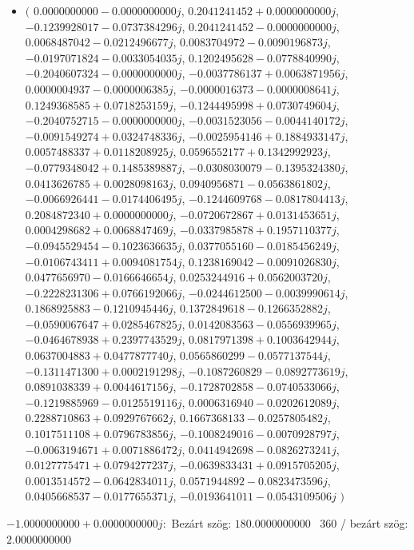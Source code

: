 \documentclass[14pt,a4paper]{article}
\begin{document}
\begin{itemize}
\item
$\big($
$0.0000000000-0.0000000000j$, $0.2041241452+0.0000000000j$, $-0.1239928017-0.0737384296j$, $0.2041241452-0.0000000000j$, $0.0068487042-0.0212496677j$, $0.0083704972-0.0090196873j$, $-0.0197071824-0.0033054035j$, $0.1202495628-0.0778840990j$, $-0.2040607324-0.0000000000j$, $-0.0037786137+0.0063871956j$, $0.0000004937-0.0000006385j$, $-0.0000016373-0.0000008641j$, $0.1249368585+0.0718253159j$, $-0.1244495998+0.0730749604j$, $-0.2040752715-0.0000000000j$, $-0.0031523056-0.0044140172j$, $-0.0091549274+0.0324748336j$, $-0.0025954146+0.1884933147j$, $0.0057488337+0.0118208925j$, $0.0596552177+0.1342992923j$, $-0.0779348042+0.1485389887j$, $-0.0308030079-0.1395324380j$, $0.0413626785+0.0028098163j$, $0.0940956871-0.0563861802j$, $-0.0066926441-0.0174406495j$, $-0.1244609768-0.0817804413j$, $0.2084872340+0.0000000000j$, $-0.0720672867+0.0131453651j$, $0.0004298682+0.0068847469j$, $-0.0337985878+0.1957110377j$, $-0.0945529454-0.1023636635j$, $0.0377055160-0.0185456249j$, $-0.0106743411+0.0094081754j$, $0.1238169042-0.0091026830j$, $0.0477656970-0.0166646654j$, $0.0253244916+0.0562003720j$, $-0.2228231306+0.0766192066j$, $-0.0244612500-0.0039990614j$, $0.1868925883-0.1210945446j$, $0.1372849618-0.1266352882j$, $-0.0590067647+0.0285467825j$, $0.0142083563-0.0556939965j$, $-0.0464678938+0.2397743529j$, $0.0817971398+0.1003642944j$, $0.0637004883+0.0477877740j$, $0.0565860299-0.0577137544j$, $-0.1311471300+0.0002191298j$, $-0.1087260829-0.0892773619j$, $0.0891038339+0.0044617156j$, $-0.1728702858-0.0740533066j$, $-0.1219885969-0.0125519116j$, $0.0006316940-0.0202612089j$, $0.2288710863+0.0929767662j$, $0.1667368133-0.0257805482j$, $0.1017511108+0.0796783856j$, $-0.1008249016-0.0070928797j$, $-0.0063194671+0.0071886472j$, $0.0414942698-0.0826273241j$, $0.0127775471+0.0794277237j$, $-0.0639833431+0.0915705205j$, $0.0013514572-0.0642834011j$, $0.0571944892-0.0823473596j$, $0.0405668537-0.0177655371j$, $-0.0193641011-0.0543109506j$
$\big)$
\end{itemize}
$-1.0000000000+0.0000000000j$:\
Bezárt szög: $180.0000000000$ \
360 / bezárt szög: $2.0000000000$\
\end{document}
